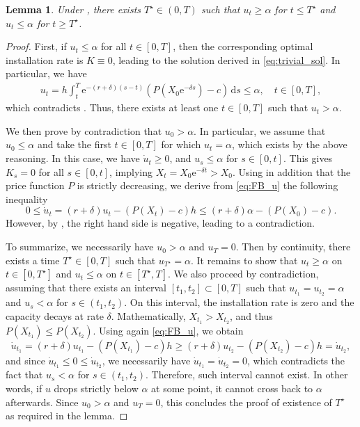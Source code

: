 \documentclass[12pt]{article}
\newtheorem{lemma}{Lemma}[section]
\def\erm{\mathrm{e}}
\def\drm{\mathrm{d}}
\begin{document}
\begin{lemma}\label{T^* lemma}
Under , there exists ${T^\star } \in (0,T)$ such that $u_t\geq \alpha$ for $t\leq {T^\star }
$ and $u_t\leq \alpha$ for $t\geq {T^\star }$.
\end{lemma}
\begin{proof}
First, if $u_t \leq \alpha$ for all $t \in [0,T]$, then the corresponding optimal installation rate is $K\equiv 0$, leading to the solution derived in \eqref{eq:trivial_sol}. In particular, we have
\begin{align*}
    u_t = h\int_{t}^{T} \erm^{-(r+\delta)(s-t)}(P(X_0 \erm^{-\delta s})-c)\, \drm s \leq \alpha, \quad t \in [0,T],
\end{align*}
which contradicts . Thus, there exists at least one $t \in[0,T]$ such that $u_t > \alpha$. 

We then prove by contradiction that $u_0 > \alpha$. In particular, we assume that $u_0\leq \alpha$ and take the first $t \in [0,T]$ for which $u_t=\alpha$, which exists by the above reasoning. In this case, we have $\dot{u}_t \geq0$, and $u_s \leq \alpha$ for $s \in [0,t]$. This gives $K_s = 0$ for all $s \in [0,t]$, implying $X_t=X_0 \erm^{-\delta t} > X_0$.
Using in addition that the price function $P$ is strictly decreasing, we derive from \eqref{eq:FB_u} the following inequality
\begin{equation*}
0\leq \dot{u}_t = (r+\delta)u_t -\left(P(X_t)-c\right)h \leq (r+\delta) \alpha-\left(P(X_0)-c\right).
\end{equation*}
However, by , the right hand side is negative, leading to a contradiction. 

To summarize, we necessarily have $u_0 > \alpha$ and $u_T = 0$. Then by continuity, there exists a time $T^\star \in [0,T]$ such that $u_{T^\star} = \alpha$. It remains to show that $u_t \geq \alpha$ on $t \in [0,T^\star]$ and $u_t \leq \alpha$ on $t \in [T^\star,T]$. We also proceed by contradiction, assuming that there exists an interval $[t_1, t_2] \subset [0,T]$ such that $u_{t_1}=u_{t_2}=\alpha$ and $u_s < \alpha$ for $s \in (t_1,t_2)$. On this interval, the installation rate is zero and the capacity decays at rate $\delta$. Mathematically, $X_{t_1}>X_{t_2}$, and thus $P(X_{t_1})\leq P(X_{t_2})$. Using again \eqref{eq:FB_u}, we obtain
\begin{equation*}
\dot{u}_{t_1}=(r+\delta)u_{t_1}-(P(X_{t_1})-c)h \geq (r+\delta)u_{t_2}-(P(X_{t_2})-c) h=\dot{u}_{t_2},
\end{equation*}
and since $\dot{u}_{t_1}\leq 0 \leq \dot{u}_{t_2}$, we necessarily have $\dot{u}_{t_1}= \dot{u}_{t_2}=0$, which contradicts the fact that $u_s < \alpha$ for $s \in (t_1,t_2)$. Therefore, such interval cannot exist. In other words, if $u$ drops strictly below $\alpha$ at some point, it cannot cross back to $\alpha$ afterwards. Since $u_0 > \alpha$ and $u_T = 0$, this concludes the proof of existence of ${T^\star }$ as required in the lemma.
\end{proof}
\end{document}
